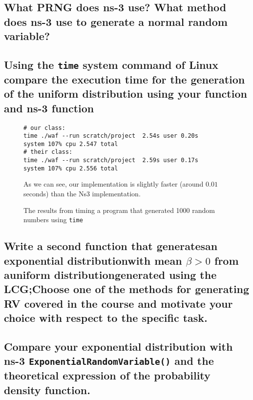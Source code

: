 \documentclass[a4paper, titlepage,12pt]{article}
\begin{document}
		\subsection{What PRNG does ns-3 use?  What method does ns-3 use to generate a normal random variable?}
		\subsection{Using the \lstinline{time} system command of Linux compare the execution time for the generation of the uniform distribution using your function and ns-3 function}
		\begin{figure}[h!]
			\begin{lstlisting}
# our class: 
time ./waf --run scratch/project  2.54s user 0.20s 
system 107% cpu 2.547 total
# their class: 
time ./waf --run scratch/project  2.59s user 0.17s 
system 107% cpu 2.556 total
			\end{lstlisting}
			\caption{The results from timing a program that generated 1000 random numbers using \lstinline{time}}

			As we can see, our implementation is slightly faster (around $0.01$ seconds) than the Ns3 implementation.
		\end{figure}
		\subsection{Write a second function that generatesan exponential distributionwith mean $\beta>0$ from auniform distributiongenerated using the LCG;Choose one of the methods for generating RV covered in the course and motivate your choice with respect to the specific task.}
		\subsection{Compare your exponential distribution with ns-3 \lstinline{ExponentialRandomVariable()} and the theoretical expression of the probability density function.}
\end{document}
